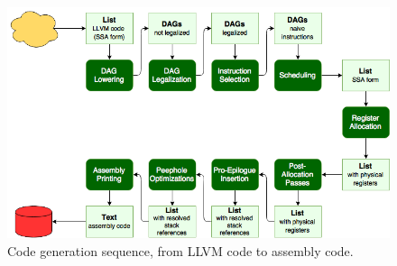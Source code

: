 \begin{figure}[t]
\centering
\includegraphics[width=.85\textwidth]{figures/code_generation_sequence}
\caption{Code generation sequence, from LLVM code to assembly code.}
\label{fig:code_generation}
\end{figure}

